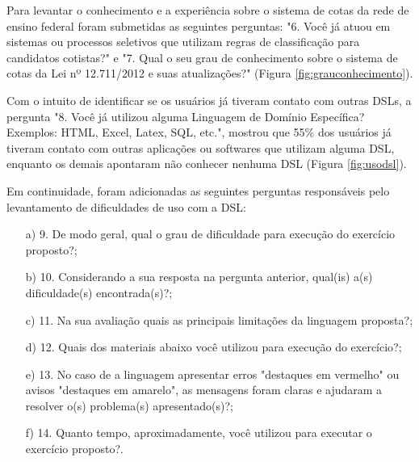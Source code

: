 

\newpage
Para levantar o conhecimento e a experiência sobre o sistema de cotas da rede de ensino federal foram submetidas as seguintes perguntas: "6. Você já atuou em sistemas ou processos seletivos que utilizam regras de classificação para candidatos cotistas?" e "7. Qual o seu grau de conhecimento sobre o sistema de cotas da Lei nº 12.711/2012 e suas atualizações?" (Figura \ref{fig:grauconhecimento}).



Com o intuito de identificar se os usuários já tiveram contato com outras DSLs, a pergunta "8. Você já utilizou alguma Linguagem de Domínio Específica? Exemplos: HTML, Excel, Latex, SQL, etc.", mostrou que 55\% dos usuários já tiveram contato com outras aplicações ou softwares que utilizam alguma \gls{DSL}, enquanto os demais apontaram não conhecer nenhuma DSL (Figura \ref{fig:usodsl}).



\newpage
Em continuidade, foram adicionadas as seguintes perguntas responsáveis pelo levantamento de dificuldades de uso com a DSL:

\begin{enumerate}

    \item[a)] 9. De modo geral, qual o grau de dificuldade para execução do exercício proposto?;
    
    \item[b)] 10. Considerando a sua resposta na pergunta anterior, qual(is) a(s) dificuldade(s) encontrada(s)?;
    
    \item[c)] 11. Na sua avaliação quais as principais limitações da linguagem proposta?;
    
   \item[d)]  12. Quais dos materiais abaixo você utilizou para execução do exercício?;
   
   \item[e)] 13. No caso de a linguagem apresentar erros "destaques em vermelho" ou avisos "destaques em amarelo", as mensagens foram claras e ajudaram a resolver o(s) problema(s) apresentado(s)?;
   
   \item[f)] 14. Quanto tempo, aproximadamente, você utilizou para executar o exercício proposto?.   

\end{enumerate}

